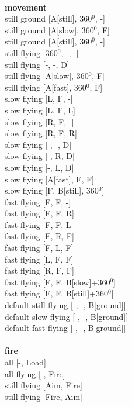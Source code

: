 \ \\ {\bf movement } \\
still ground [A[still], 360$^0$, -] \\
still ground [A[slow], 360$^0$, F] \\
still ground [A[still], 360$^0$, -] \\
still flying [360$^0$, -, -] \\
still flying [-, -, D] \\
still flying [A[slow], 360$^0$, F] \\
still flying [A[fast], 360$^0$, F] \\
slow flying [L, F, -] \\
slow flying [L, F, L] \\
slow flying [R, F, -] \\
slow flying [R, F, R] \\
slow flying [-, -, D] \\
slow flying [-, R, D] \\
slow flying [-, L, D] \\
slow flying [A[fast], F, F] \\
slow flying [F, B[still], 360$^0$] \\
fast flying [F, F, -] \\
fast flying [F, F, R] \\
fast flying [F, F, L] \\
fast flying [F, R, F] \\
fast flying [F, L, F] \\
fast flying [L, F, F] \\
fast flying [R, F, F] \\
fast flying [F, F, B[slow]+360$^0$] \\
fast flying [F, F, B[still]+360$^0$] \\
default still flying [-, -, B[ground]] \\
default slow flying [-, -, B[ground]] \\
default fast flying [-, -, B[ground]] \\
\ \\ {\bf fire } \\
all [-, Load] \\
all flying [-, Fire] \\
still flying [Aim, Fire] \\
still flying [Fire, Aim] \\


